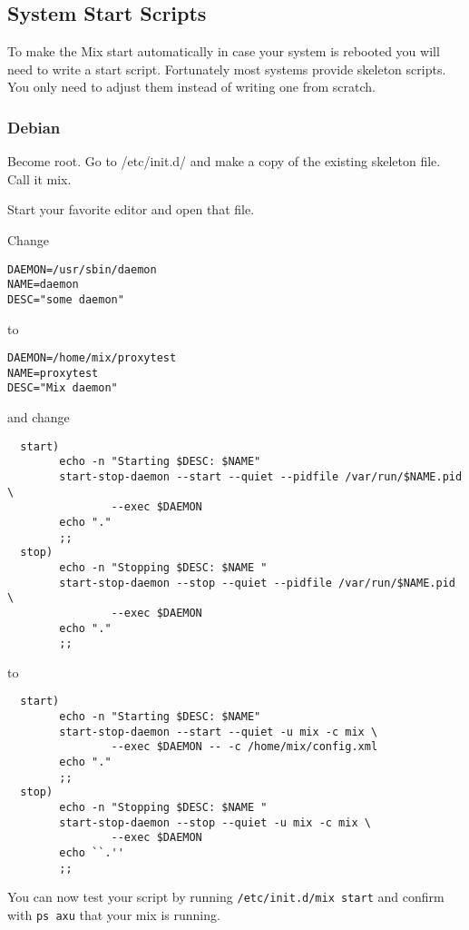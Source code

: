 \documentclass{article}
\begin{document}
\subsection {System Start Scripts}

To make the Mix start automatically in case your system is rebooted
you will need to write a start script. Fortunately most systems
provide skeleton scripts. You only need to adjust them instead of
writing one from scratch.


\subsubsection {Debian}

Become root. Go to /etc/init.d/ and make a copy of the existing
skeleton file. Call it mix.

Start your favorite editor and open that file.

Change
\begin{verbatim}
DAEMON=/usr/sbin/daemon
NAME=daemon
DESC="some daemon"
\end{verbatim}
to
\begin{verbatim}
DAEMON=/home/mix/proxytest
NAME=proxytest
DESC="Mix daemon"
\end{verbatim}

and change

\begin{verbatim}
  start)
        echo -n "Starting $DESC: $NAME"
        start-stop-daemon --start --quiet --pidfile /var/run/$NAME.pid \
                --exec $DAEMON
        echo "."
        ;;
  stop)
        echo -n "Stopping $DESC: $NAME "
        start-stop-daemon --stop --quiet --pidfile /var/run/$NAME.pid \
                --exec $DAEMON
        echo "."
        ;;
\end{verbatim}

to

\begin{verbatim}
  start)
        echo -n "Starting $DESC: $NAME"
        start-stop-daemon --start --quiet -u mix -c mix \
                --exec $DAEMON -- -c /home/mix/config.xml
        echo "."
        ;;
  stop)
        echo -n "Stopping $DESC: $NAME "
        start-stop-daemon --stop --quiet -u mix -c mix \
                --exec $DAEMON
        echo ``.''
        ;;
\end{verbatim}


You can now test your script by running \texttt{/etc/init.d/mix start} and
confirm with \texttt{ps axu} that your mix is running.
\end{document}

